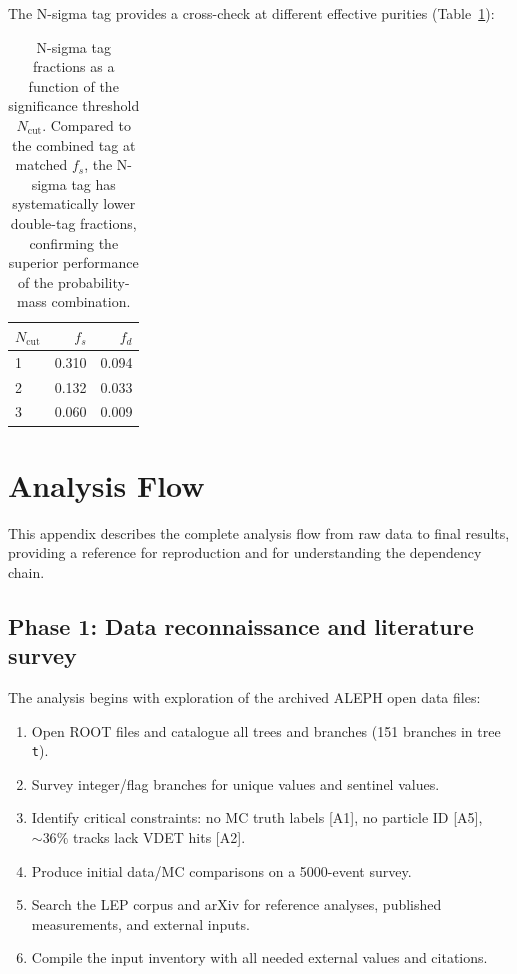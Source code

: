 \documentclass[11pt,a4paper]{article}
\begin{document}
The N-sigma tag provides a cross-check at different effective purities
(Table~\ref{tab:nsigma_fractions}):

\begin{table}[htbp]
\centering
\caption{N-sigma tag fractions as a function of the significance threshold $N_\mathrm{cut}$.
Compared to the combined tag at matched $f_s$, the N-sigma tag has systematically lower
double-tag fractions, confirming the superior performance of the probability-mass combination.}
\label{tab:nsigma_fractions}
\begin{tabular}{lrr}
\toprule
$N_\mathrm{cut}$ & $f_s$ & $f_d$ \\
\midrule
1 & 0.310 & 0.094 \\
2 & 0.132 & 0.033 \\
3 & 0.060 & 0.009 \\
\bottomrule
\end{tabular}
\end{table}

\section{Analysis Flow}
\label{app:analysis_flow}

This appendix describes the complete analysis flow from raw data to final results,
providing a reference for reproduction and for understanding the dependency chain.

\subsection{Phase 1: Data reconnaissance and literature survey}

The analysis begins with exploration of the archived ALEPH open data files:
\begin{enumerate}
\item Open ROOT files and catalogue all trees and branches (151 branches in tree \texttt{t}).
\item Survey integer/flag branches for unique values and sentinel values.
\item Identify critical constraints: no MC truth labels [A1], no particle ID [A5],
$\sim 36\%$ tracks lack VDET hits [A2].
\item Produce initial data/MC comparisons on a 5000-event survey.
\item Search the LEP corpus and arXiv for reference analyses, published measurements,
and external inputs.
\item Compile the input inventory with all needed external values and citations.
\end{enumerate}
\end{document}

